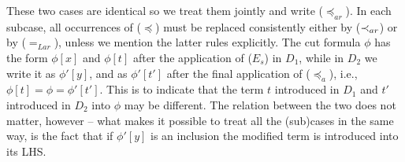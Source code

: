 \begin{PROOF}
\begin{LS}
\begin{LSA}
\begin{LSB}
  \noindent
   These two cases are identical so we treat them jointly and
  write ($\preceq_{ar}$). In each subcase, all occurrences of ($\preceq$) must be
  replaced consistently either by ($\mathbin{\prec}_{ar}$) or by ($=_{Lar}$), unless we
  mention the latter rules explicitly. The cut formula $\phi$ 
has the form $\phi[x]$ and $\phi[t]$ after the application of ($E_s$) in $D_1$, while in $D_2$ we 
write it as $\phi'[y]$, and as $\phi'[t']$ after the final application of ($\preceq_a$), i.e., 
 $\phi[t] = \phi = \phi'[t']$. This is to indicate that the term $t$ introduced in $D_1$ and
$t'$ introduced in $D_2$ into $\phi$ may be different. The relation between the two
 does not matter, however -- what makes it possible to treat all the (sub)cases in
the same way, is the fact that if $\phi'[y]$ is an inclusion the modified term is introduced into
its LHS.


\end{LSB}
\end{LSA}
\end{LS}
\end{PROOF}
